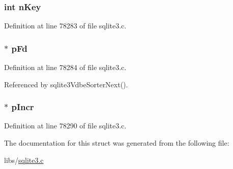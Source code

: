 \subsubsection[{n\+Key}]{\setlength{\rightskip}{0pt plus 5cm}int n\+Key}\label{struct_pma_reader_aec3f75e476fad43cd9f74b896c9c7a14}


Definition at line 78283 of file sqlite3.\+c.

\hypertarget{struct_pma_reader_ae44362cf35caac454319be8c145e374e}{}
\subsubsection[{p\+Fd}]{$\ast$ p\+Fd}\label{struct_pma_reader_ae44362cf35caac454319be8c145e374e}


Definition at line 78284 of file sqlite3.\+c.



Referenced by sqlite3\+Vdbe\+Sorter\+Next().

\hypertarget{struct_pma_reader_a0a87839a608a5ba48d1c92694ae9cd5e}{}
\subsubsection[{p\+Incr}]{$\ast$ p\+Incr}\label{struct_pma_reader_a0a87839a608a5ba48d1c92694ae9cd5e}


Definition at line 78290 of file sqlite3.\+c.



The documentation for this struct was generated from the following file\+:\begin{DoxyCompactItemize}
\item 
libs/\hyperlink{sqlite3_8c}{sqlite3.\+c}\end{DoxyCompactItemize}
